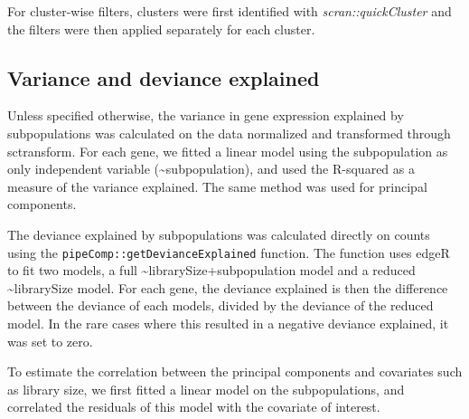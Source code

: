 \documentclass{bmcart}
\begin{document}
For cluster-wise filters, clusters were first identified with \textit{scran::quickCluster} and the filters were then applied separately for each cluster.


\subsection*{Variance and deviance explained}

Unless specified otherwise, the variance in gene expression explained by subpopulations was calculated on the data normalized and transformed through sctransform. For each gene, we fitted a linear model using the subpopulation as only independent variable (\textasciitilde subpopulation), and used the R-squared as a measure of the variance explained. The same method was used for principal components.

The deviance explained by subpopulations was calculated directly on counts using the \texttt{pipeComp::getDevianceExplained} function. The function uses edgeR to fit two models, a full \textasciitilde librarySize+subpopulation model and a reduced \textasciitilde librarySize model. For each gene, the deviance explained is then the difference between the deviance of each models, divided by the deviance of the reduced model. In the rare cases where this resulted in a negative deviance explained, it was set to zero.

To estimate the correlation between the principal components and covariates such as library size, we first fitted a linear model on the subpopulations, and correlated the residuals of this model with the covariate of interest.


\end{document}
